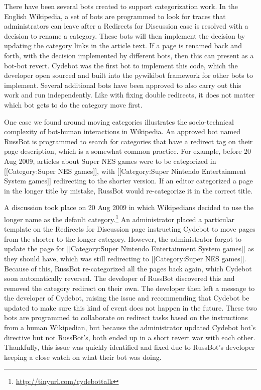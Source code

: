 \documentclass[format=acmsmall, review=false, screen=true]{acmart}%
\begin{document}
There have been several bots created to support categorization work. In the English Wikipedia, a set of bots are programmed to look for traces that administrators can leave after a Redirects for Discussion case is resolved with a decision to rename a category. These bots will then implement the decision by updating the category links in the article text. If a page is renamed back and forth, with the decision implemented by different bots, then this can present as a bot-bot revert. Cydebot was the first bot to implement this code, which the developer open sourced and built into the pywikibot framework for other bots to implement. Several additional bots have been approved to also carry out this work and run independently. Like with fixing double redirects, it does not matter which bot gets to do the category move first.  

One case we found around moving categories illustrates the socio-technical complexity of bot-human interactions in Wikipedia. An approved bot named RussBot is programmed to search for categories that have a redirect tag on their page description, which is a somewhat common practice. For example, before 20 Aug 2009, articles about Super NES games were to be categorized in [[Category:Super NES games]], with [[Category:Super Nintendo Entertainment System games]] redirecting to the shorter version. If an editor categorized a page in the longer title by mistake, RussBot would re-categorize it in the correct title. 

A discussion took place on 20 Aug 2009 in which Wikipedians decided to use the longer name as the default category.\footnote{ \url{http://tinyurl.com/cydebottalk} } An administrator placed a particular template on the Redirects for Discussion page instructing Cydebot to move pages from the shorter to the longer category. However, the administrator forgot to update the page for [[Category:Super Nintendo Entertainment System games]] as they should have, which was still redirecting to [[Category:Super NES games]]. Because of this, RussBot re-categorized all the pages back again, which Cydebot soon automatically reversed. The developer of RussBot discovered this and removed the category redirect on their own. The developer then left a message to the developer of Cydebot, raising the issue and recommending that Cydebot be updated to make sure this kind of event does not happen in the future. These two bots are programmed to collaborate on redirect tasks based on the instructions from a human Wikipedian, but because the administrator updated Cydebot bot's directive but not RussBot's, both ended up in a short revert war with each other. Thankfully, this issue was quickly identified and fixed due to RussBot's developer keeping a close watch on what their bot was doing.
\end{document}
